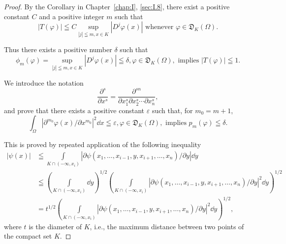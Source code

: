 \begin{proof}
 By the Corollary in Chapter~\ref{chap:I}, \ref{sec:I.8}, there exist a positive constant $C$ and a positive integer $m$ such that 
\begin{equation}\label{eq:III.11.2}
\left| T (\varphi) \right| \leqq C \sup\limits _{| j | \leqq m, x \in K} \left| D ^{j} \varphi (x) \right| \text{ whenever } \varphi \in \mathfrak {D} _{K} (\Omega). \end{equation}

Thus there exists a positive number $\delta$ such that 
\begin{equation}\label{eq:III.11.3}
\phi_{m} (\varphi) = \sup\limits _{| j | \leqq m, x \in K} | D ^{j} \varphi (x) | \leqq \delta , \varphi \in \mathfrak {D} _{K} (\Omega), \text{ implies } | T (\varphi) | \leqq 1.
\end{equation}

We introduce the notation 
\begin{equation}\label{eq:III.11.4}
\frac {\partial^{s}}{\partial x ^{s}} = \frac {\partial^{sn}}{\partial x _{1} ^{s} \partial x _{2} ^{s} \cdots \partial x _{n} ^{s}},
\end{equation}
and prove that there exists a positive constant $\varepsilon$ such that, for $m_0 = m + 1$, 
\begin{equation}\label{eq:III.11.5}
\int_{\Omega} \left| \partial^ {m _{0}} \varphi (x) / \partial x ^ {m _{0}} \right| ^{2} \dd x \leqq \varepsilon , \varphi \in \mathfrak {D} _{K} (\Omega), \text{ implies } p _{m} (\varphi) \leqq \delta .
\end{equation}

This is proved by repeated application of the following inequality 
\[
\begin{aligned}
\left| \psi (x) \right|& \leqq \underset {K \cap (- \infty , x _{i})} {\int} \left| \partial \psi (x _{1}, \dots , x _{i-1}, y, x _{i+1}, \dots , x _{n}) / \partial y \right| \dd y
\\
&\leqq \left(\underset {K \cap (- \infty , x _{i})} {\int} \dd y\right) ^{1/2} \left(\underset {K \cap (- \infty , x _{i})} {\int} \left| \partial \psi (x _{1}, \dots , x _{i-1}, y, x _{i+1}, \dots , x _{n}) / \partial y \right| ^{2} \dd y\right) ^{1/2}
\\
&= t ^{1/2} \left(\underset {K \cap (- \infty , x _{i})} {\int} \left| \partial \psi (x _{1}, \dots , x _{i-1}, y, x _{i+1}, \dots , x _{n}) / \partial y \right| ^{2} \dd y\right) ^{1/2},
\end{aligned}
\]
where $t$ is the diameter of $K$, i.e., the maximum distance between two points of the compact set $K$. 


\end{proof}
